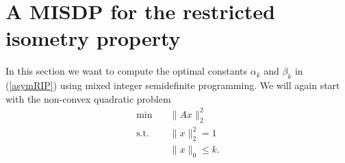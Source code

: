 \documentclass[a4paper,11pt,1p]{elsarticle}
\newcommand{\Norm}[2]{\lVert{#1}\rVert_{#2}}
\newcommand{\T}{^{\top}}
\begin{document}
 


\section{A MISDP for the restricted isometry property}
\label{sec:MISDP}

In this section we want to compute the optimal constants $\alpha_k$ and $\beta_k$ in (\ref{asymRIP}) using mixed integer semidefinite programming. We will again start with the non-convex quadratic problem
\begin{align}\label{QP2}
 \min \quad & \Norm{Ax}{2}^2 \nonumber \\
 \text{s.t.} \quad & \Norm{x}{2}^2 = 1 \tag{QP} \\
 & \Norm{x}{0} \leq k. \nonumber
\end{align}
\end{document}
